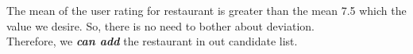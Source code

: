 The mean of the user rating for restaurant is greater than the mean 7.5 which the value we desire. So, there is no need to bother about deviation. \\

Therefore, we \textit{\textbf{can add}} the restaurant in out candidate list.

